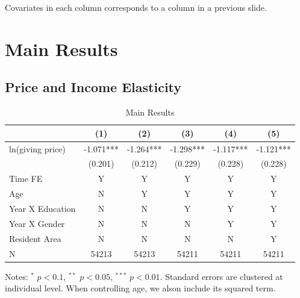 \documentclass[ review  , 3p ]{elsarticle}
\begin{document}
  Covariates in each column corresponds to a column in a previous slide.
  
  \hypertarget{main-results}{%
  \section{Main Results}\label{main-results}}
  
  \hypertarget{price-and-income-elasticity}{%
  \subsection{Price and Income Elasticity}\label{price-and-income-elasticity}}
  
  \begin{table}
  
  \caption{\label{tab:kableEstimateElasticityPart1}Main Results}
  \centering
  \begin{threeparttable}
  \begin{tabular}[t]{lccccc}
  \toprule
   & (1) & (2) & (3) & (4) & (5)\\
  \midrule
  ln(giving price) & -1.071*** & -1.264*** & -1.298*** & -1.117*** & -1.121***\\
   & (0.201) & (0.212) & (0.229) & (0.228) & (0.228)\\
  Time FE & Y & Y & Y & Y & Y\\
  Age & N & Y & Y & Y & Y\\
  Year X Education & N & N & Y & Y & Y\\
  Year X Gender & N & N & N & Y & Y\\
  Resident Area & N & N & N & N & Y\\
  N & 54213 & 54213 & 54211 & 54211 & 54211\\
  \bottomrule
  \end{tabular}
  \begin{tablenotes}
  \item Notes: $^{*}$ $p < 0.1$, $^{**}$ $p < 0.05$, $^{***}$ $p < 0.01$. Standard errors are clustered at individual level. When controlling age, we alson include its squared term.
  \end{tablenotes}
  \end{threeparttable}
  \end{table}
  
\end{document}
